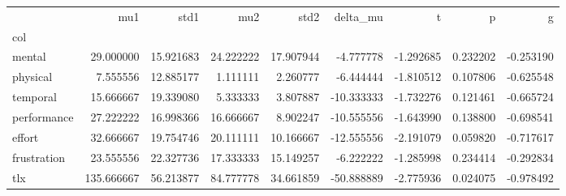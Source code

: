 \begin{tabular}{lrrrrrrrr}
\toprule
{} &         mu1 &       std1 &        mu2 &       std2 &   delta\_mu &         t &         p &         g \\
col         &             &            &            &            &            &           &           &           \\
\midrule
mental      &   29.000000 &  15.921683 &  24.222222 &  17.907944 &  -4.777778 & -1.292685 &  0.232202 & -0.253190 \\
physical    &    7.555556 &  12.885177 &   1.111111 &   2.260777 &  -6.444444 & -1.810512 &  0.107806 & -0.625548 \\
temporal    &   15.666667 &  19.339080 &   5.333333 &   3.807887 & -10.333333 & -1.732276 &  0.121461 & -0.665724 \\
performance &   27.222222 &  16.998366 &  16.666667 &   8.902247 & -10.555556 & -1.643990 &  0.138800 & -0.698541 \\
effort      &   32.666667 &  19.754746 &  20.111111 &  10.166667 & -12.555556 & -2.191079 &  0.059820 & -0.717617 \\
frustration &   23.555556 &  22.327736 &  17.333333 &  15.149257 &  -6.222222 & -1.285998 &  0.234414 & -0.292834 \\
tlx         &  135.666667 &  56.213877 &  84.777778 &  34.661859 & -50.888889 & -2.775936 &  0.024075 & -0.978492 \\
\bottomrule
\end{tabular}
